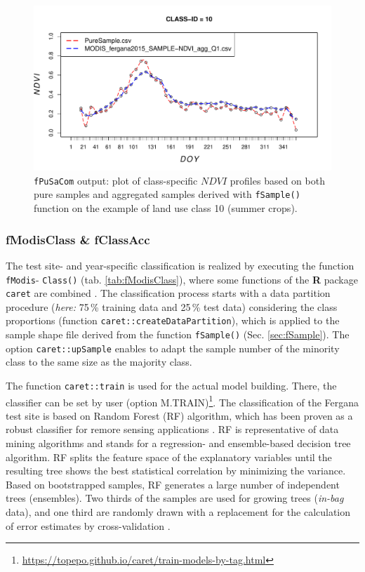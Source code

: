 \begin{figure}[H]
\centering\includegraphics[width=1\textwidth]{figures/PureSample__MODIS_fergana2015_SAMPLE-NDVI_agg_Q1_Part1.pdf}
\caption{\texttt{fPuSaCom} output: plot of class-specific $NDVI$ profiles based on both pure samples and aggregated samples derived with \texttt{fSample()} function on the example of land use class 10 (summer crops).}\label{fig:fPuSaCom}
\end{figure}






\subsubsection{fModisClass \& fClassAcc}\label{sec:fModisClass}
The test site- and year-specific classification is realized by executing the function \texttt{fModis}- \texttt{Class()} (tab. \ref{tab:fModisClass}), where some functions of the \textbf{R} package \texttt{caret} are combined \citep{KuhnJohnson2013apm,Kuhn-etal2018}. The  classification process starts with a data partition procedure (\textit{here:} 75\,\% training data and 25\,\% test data) considering the class proportions (function \texttt{caret::createDataPartition}), which is applied to the sample shape file derived from the  function \texttt{fSample()} (Sec. \ref{sec:fSample}). The option \texttt{caret::upSample} enables to adapt the sample number of the minority class to the same size as the majority class.\

The function \texttt{caret::train} is used for the actual model building. There, the classifier can be set by user (option M.TRAIN)\footnote{\url{https://topepo.github.io/caret/train-models-by-tag.html}}. 
The classification of the Fergana test site is based on Random Forest (RF) algorithm, which has been proven as a robust classifier for remore sensing applications \citep{BelgiuDragut2016jprs}. RF is  representative of data mining algorithms and stands for a re\-gres\-si\-on- and ensemble-based decision tree algorithm. RF splits the feature space of the explanatory variables until the resulting tree shows the best statistical correlation by minimizing the variance. Based on bootstrapped samples, RF generates a large number of independent trees (ensembles). Two thirds of the samples are used for growing trees (\textit{in-bag} data), and one third are randomly drawn with a replacement for the calculation of error estimates by cross-validation  \citep[\textit{out-of-bag} data; ][]{Breiman2001ml}.\


